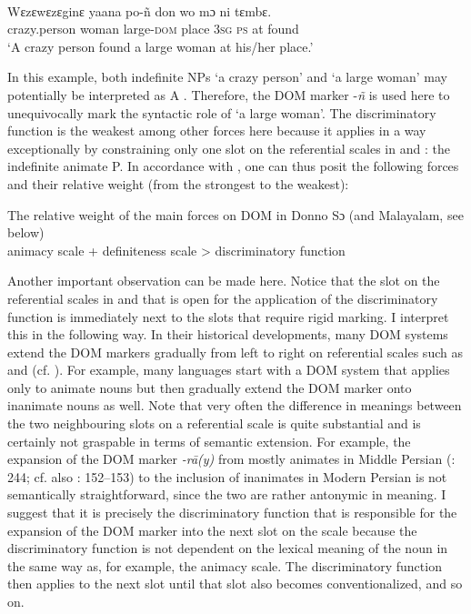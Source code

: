 \documentclass[output=paper]{langsci/langscibook}
\begin{document}
\ea\label{ex:serzant:}
\\
\gll Wɛzɛwɛzɛginɛ   yaana     po-ñ     don   wo mɔ ni tɛmbɛ.\\
     crazy.person  woman    large\textsc{{}-dom}   place  \textsc{3sg} \textsc{ps}  at found\\
\glt ‘A crazy person found a large woman at his/her place.’
\z

In this example, both indefinite NPs ‘a crazy person’ and ‘a large woman’ may potentially be interpreted as A \citep[53]{Culy1995}. Therefore, the DOM marker -\textit{ñ} is used here to unequivocally mark the syntactic role of ‘a large woman’. The discriminatory function is the weakest among other forces here \citep[53]{Culy1995} because it applies in a way exceptionally by constraining only one slot on the referential scales in  and : the indefinite animate P. In accordance with \citet[51]{Culy1995}, one can thus posit the following forces and their relative weight (from the strongest to the weakest): 

\ea\label{ex:serzant:9}
The relative weight of the main forces on DOM in Donno Sɔ (and Malayalam, see below)\\
animacy scale + definiteness scale > discriminatory function\\
\z

Another important observation can be made here. Notice that the slot on the referential scales in  and  that is open for the application of the discriminatory function is immediately next to the slots that require rigid marking. I interpret this in the following way. In their historical developments, many DOM systems extend the DOM markers gradually from left to right on referential scales such as  and  (cf. \citealt{DalrympleNikolaeva2011}). For example, many languages start with a DOM system that applies only to animate nouns but then gradually extend the DOM marker onto inanimate nouns as well. Note that very often the difference in meanings between the two neighbouring slots on a referential scale is quite substantial and is certainly not graspable in terms of semantic extension. For example, the expansion of the DOM marker \textit{{}-rā(y)} from mostly animates in Middle Persian (\citealt{Key2008}: 244; cf. also \citealt{Paul2008}: 152–153) to the inclusion of inanimates in Modern Persian is not semantically straightforward, since the two are rather antonymic in meaning. I suggest that it is precisely the discriminatory function that is responsible for the expansion of the DOM marker into the next slot on the scale because the discriminatory function is not dependent on the lexical meaning of the noun in the same way as, for example, the animacy scale. The discriminatory function then applies to the next slot until that slot also becomes conventionalized, and so on. 
\end{document}

